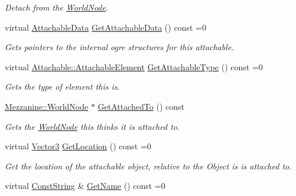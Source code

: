 \begin{DoxyCompactItemize}
\begin{DoxyCompactList}\small\item\em Detach from the \hyperlink{classMezzanine_1_1WorldNode}{WorldNode}. \item\end{DoxyCompactList}\item 
virtual \hyperlink{structMezzanine_1_1AttachableData}{AttachableData} \hyperlink{classMezzanine_1_1Attachable_aeed457c614552bd753e7669cb7624b19}{GetAttachableData} () const =0
\begin{DoxyCompactList}\small\item\em Gets pointers to the internal ogre structures for this attachable. \item\end{DoxyCompactList}\item 
virtual \hyperlink{classMezzanine_1_1Attachable_a274bd45f9666f6e50f6fdd8a0162bc9e}{Attachable::AttachableElement} \hyperlink{classMezzanine_1_1Attachable_aacb1a1958cca1f005c1313f14e3d098d}{GetAttachableType} () const =0
\begin{DoxyCompactList}\small\item\em Gets the type of element this is. \item\end{DoxyCompactList}\item 
\hyperlink{classMezzanine_1_1WorldNode}{Mezzanine::WorldNode} $\ast$ \hyperlink{classMezzanine_1_1Attachable_afbb1f55b0ef23cfaa4aea248c1356224}{GetAttachedTo} () const 
\begin{DoxyCompactList}\small\item\em Gets the \hyperlink{classMezzanine_1_1WorldNode}{WorldNode} this thinks it is attached to. \item\end{DoxyCompactList}\item 
virtual \hyperlink{classMezzanine_1_1Vector3}{Vector3} \hyperlink{classMezzanine_1_1Attachable_a1a8e18e5654c50f24bc049c228603d71}{GetLocation} () const =0
\begin{DoxyCompactList}\small\item\em Get the location of the attachable object, relative to the Object is is attached to. \item\end{DoxyCompactList}\item 
\hypertarget{classMezzanine_1_1Attachable_a6a49ac8c2ddb2dd8ed7dd17f96ecafe5}{
virtual \hyperlink{namespaceMezzanine_a63cd699ac54b73953f35ec9cfc05e506}{ConstString} \& \hyperlink{classMezzanine_1_1Attachable_a6a49ac8c2ddb2dd8ed7dd17f96ecafe5}{GetName} () const =0}
\label{classMezzanine_1_1Attachable_a6a49ac8c2ddb2dd8ed7dd17f96ecafe5}


\end{DoxyCompactItemize}
